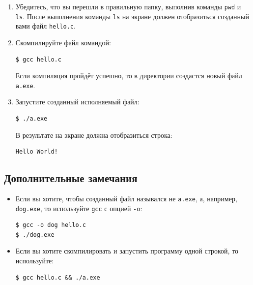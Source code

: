 \documentclass{article}
\begin{document}
\begin{enumerate}
\item Убедитесь, что вы перешли в правильную папку, выполнив команды \texttt{pwd} и \texttt{ls}. После выполнения команды \texttt{ls} на экране должен отобразиться созданный вами файл \texttt{hello.c}.

\item Скомпилируйте файл командой:
\begin{lstlisting}[style=csMiptBash]
$ gcc hello.c
\end{lstlisting}
Если компиляция пройдёт успешно, то в директории создастся новый файл \texttt{a.exe}.

\item Запустите созданный исполняемый файл:
\begin{lstlisting}[style=csMiptBash]
$ ./a.exe
\end{lstlisting}
В результате на экране должна отобразиться строка:
\begin{verbatim}
Hello World!
\end{verbatim}
\end{enumerate}


\subsection*{Дополнительные замечания}
\begin{itemize}
\item Если вы хотите, чтобы созданный файл назывался не \texttt{a.exe}, а, например, \texttt{dog.exe}, то используйте \texttt{gcc} с опцией \texttt{-o}:
\begin{lstlisting}[style=csMiptBash]
$ gcc -o dog hello.c
$ ./dog.exe
\end{lstlisting}

\item Если вы хотите скомпилировать и запустить программу одной строкой, то используйте:
\begin{lstlisting}[style=csMiptBash]
$ gcc hello.c && ./a.exe
\end{lstlisting}
\end{itemize}
\end{document}
